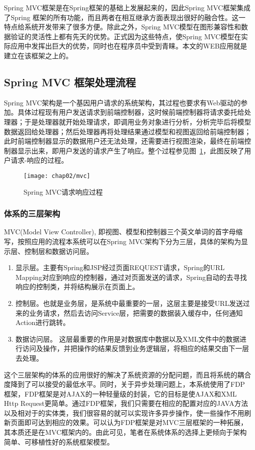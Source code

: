 Spring MVC框架是在Spring框架的基础上发展起来的，因此Spring MVC框架集成了Spring 框架的所有功能，而且两者在相互继承方面表现出很好的融合性。这一特点给系统开发带来了很多方便。除此之外，Spring MVC模型在图形兼容性和数据验证的灵活性上都有先天的优势。正式因为这些特点，使Spring MVC模型在实际应用中发挥出巨大的优势，同时也在程序员中受到青睐。本文的WEB应用就是建立在该框架之上的。
\subsection{Spring MVC 框架处理流程}
Spring MVC架构是一个基因用户请求的系统架构，其过程也要求有Web驱动的参加。具体过程现有用户发送请求到前端控制器，这时候前端控制器将请求委托给处理器；于是处理器就开始处理请求，即调用业务对象进行分析，分析完毕后将模型数据返回给处理器；然后处理器再将处理结果通过模型和视图返回给前端控制器；此时前端控制器显示的数据用户还无法处理，还需要进行视图渲染，最终在前端控制器显示出来，即用户发送的请求产生了响应\cite{李守振2006web}。整个过程参见图~\ref{fig:mvc}，此图反映了用户请求-响应的过程。
\begin{figure}[H] %
  \centering
  \texttt{[image: chap02/mvc]}
  \caption{Spring MVC请求响应过程}
  \label{fig:mvc}
\end{figure}
\subsubsection{体系的三层架构}
MVC(Model View Controller), 即视图、模型和控制器三个英文单词的首字母缩写，按照应用的流程本系统可以在Spring MVC架构下分为三层，具体的架构为显示层、控制层和数据访问层。

\begin{enumerate}
\item 显示层。主要有Spring和JSP经过页面REQUEST请求，Spring的URL Mapping对应到响应的控制器，通过对页面发送的请求，Spring自动的去寻找响应的控制类，并将结构展示在页面上。

\item 控制层。也就是业务层，是系统中最重要的一层，这层主要是接受URL发送过来的业务请求，然后去访问Service层，把需要的数据装入缓存中，任何通知Action进行跳转。

\item 数据访问层。 这层最重要的作用是对数据库中数据以及XML文件中的数据进行访问及操作，并把操作的结果反馈到业务逻辑层，将相应的结果交由下一层去处理。
\end{enumerate}
这个三层架构的体系的应用很好的解决了系统资源的分配问题，而且将系统的耦合度降到了可以接受的最低水平。同时，关于异步处理问题上，本系统使用了FDP框架，FDP框架是对AJAX的一种轻量级的封装，它的目标是使AJAX和XML Http Request更简单。通过FDP框架，我们只需要在相应的配置对应的JAVA方法以及相对于的实体类，我们很容易的就可以实现许多异步操作，使一些操作不用刷新页面即可达到相应的效果。可以认为FDP框架是对MVC三层框架的一种拓展，其本质还是在MVC框架内的。由此可见，笔者在系统体系的选择上更倾向于架构简单、可移植性好的系统框架模型。
